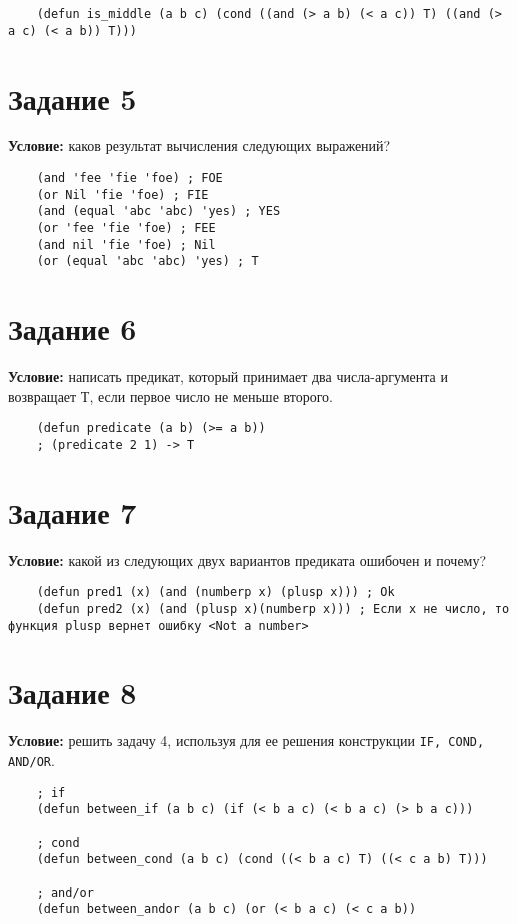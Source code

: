 \begin{lstlisting}
	(defun is_middle (a b c) (cond ((and (> a b) (< a c)) T) ((and (> a c) (< a b)) T)))
\end{lstlisting}


\section{Задание 5}

\textbf{Условие:} каков результат вычисления следующих выражений?

\begin{lstlisting}
	(and 'fee 'fie 'foe) ; FOE
	(or Nil 'fie 'foe) ; FIE
	(and (equal 'abc 'abc) 'yes) ; YES
	(or 'fee 'fie 'foe) ; FEE
	(and nil 'fie 'foe) ; Nil
	(or (equal 'abc 'abc) 'yes) ; T
\end{lstlisting}


\section{Задание 6}

\textbf{Условие:} написать предикат, который принимает два числа-аргумента и возвращает Т, если первое число не меньше второго.

\begin{lstlisting}
	(defun predicate (a b) (>= a b))
	; (predicate 2 1) -> T
\end{lstlisting}


\section{Задание 7}

\textbf{Условие:} какой из следующих двух вариантов предиката ошибочен и почему?
\begin{lstlisting}
	(defun pred1 (x) (and (numberp x) (plusp x))) ; Ok
	(defun pred2 (x) (and (plusp x)(numberp x))) ; Если x не число, то функция plusp вернет ошибку <Not a number>
\end{lstlisting}


\section{Задание 8}

\textbf{Условие:} решить задачу 4, используя для ее решения конструкции \texttt{IF, COND, AND/OR}.

\begin{lstlisting}
	; if
	(defun between_if (a b c) (if (< b a c) (< b a c) (> b a c)))

	; cond 
	(defun between_cond (a b c) (cond ((< b a c) T) ((< c a b) T)))

	; and/or
	(defun between_andor (a b c) (or (< b a c) (< c a b))
\end{lstlisting}


